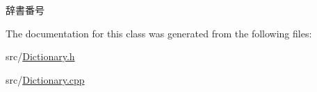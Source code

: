 辞書番号 



The documentation for this class was generated from the following files\-:\begin{DoxyCompactItemize}
\item 
src/\hyperlink{Dictionary_8h}{Dictionary.\-h}\item 
src/\hyperlink{Dictionary_8cpp}{Dictionary.\-cpp}\end{DoxyCompactItemize}
